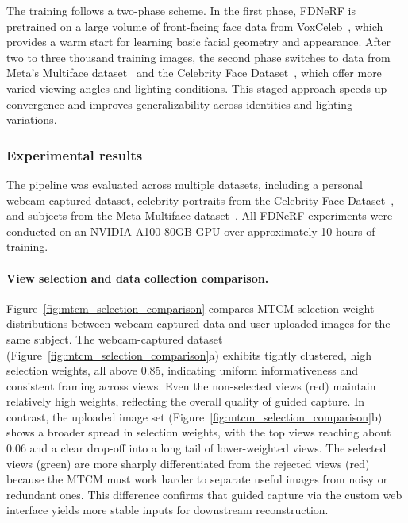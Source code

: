\documentclass[9pt,openany]{extbook}
\begin{document}
The training follows a two-phase scheme. In the first phase, FDNeRF is pretrained on a large volume of front-facing face data from VoxCeleb~\cite{nagrani2017voxceleb}, which provides a warm start for learning basic facial geometry and appearance. After two to three thousand training images, the second phase switches to data from Meta's Multiface dataset~\cite{wuu2022multiface} and the Celebrity Face Dataset~\cite{vishesh2022celebrity}, which offer more varied viewing angles and lighting conditions. This staged approach speeds up convergence and improves generalizability across identities and lighting variations.


\subsubsection{Experimental results}

The pipeline was evaluated across multiple datasets, including a personal webcam-captured dataset, celebrity portraits from the Celebrity Face Dataset~\cite{vishesh2022celebrity}, and subjects from the Meta Multiface dataset~\cite{wuu2022multiface}. All FDNeRF experiments were conducted on an NVIDIA A100 80GB GPU over approximately 10 hours of training.

\paragraph{View selection and data collection comparison.} Figure~\ref{fig:mtcm_selection_comparison} compares MTCM selection weight distributions between webcam-captured data and user-uploaded images for the same subject. The webcam-captured dataset (Figure~\ref{fig:mtcm_selection_comparison}a) exhibits tightly clustered, high selection weights, all above 0.85, indicating uniform informativeness and consistent framing across views. Even the non-selected views (red) maintain relatively high weights, reflecting the overall quality of guided capture. In contrast, the uploaded image set (Figure~\ref{fig:mtcm_selection_comparison}b) shows a broader spread in selection weights, with the top views reaching about 0.06 and a clear drop-off into a long tail of lower-weighted views. The selected views (green) are more sharply differentiated from the rejected views (red) because the MTCM must work harder to separate useful images from noisy or redundant ones. This difference confirms that guided capture via the custom web interface yields more stable inputs for downstream reconstruction.
\end{document}
